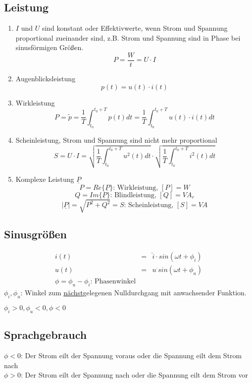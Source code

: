\documentclass[german]{article}
\begin{document}


\subsection{Leistung}
\begin{enumerate}
	\item $I$ und $U$ sind konstant oder Effektivwerte, wenn Strom und Spannung proportional zueinander sind, z.B. Strom und Spannung sind in Phase bei sinusförmigen Größen.
		\[ P = \frac{W}{t} = U \cdot I \]
	\item Augenblicksleistung
		\[ p(t) = u(t) \cdot i(t) \]
	\item Wirkleistung
		\[ P = \tilde{p} = \frac1T \int_{t_0}^{t_0 + T} p(t) dt = \frac1T \int_{t_0}^{t_0 + T} u(t) \cdot i(t) dt \]
	\item Scheinleistung, Strom und Spannung sind nicht mehr proportional
		\[ S = U \cdot I = \sqrt{\frac1T \int_{t_0}^{t_0 + T} u^2 (t) dt} \cdot \sqrt{\frac1T \int_{t_0}^{t_0 + T} i^2 (t) dt} \]
	\item Komplexe Leistung $\underline P$
		\[ P = Re\{\underline P\} \text{: Wirkleistung, } [P] = W \]
		\[ Q = Im\{\underline P\} \text{: Blindleistung, } [Q] = VA_r \]
		\[ |\underline P| = \sqrt{P^2 + Q^2} = S \text{: Scheinleistung, } [S] = VA \]
\end{enumerate}

\subsection{Sinusgrößen}

\begin{eqnarray*}
	i(t) & = & \hat{i} \cdot sin(\omega t + \phi_i) \\
	u(t) & = & u^ \cdot sin(\omega t + \phi_u) \\
	\phi = \phi_u - \phi_i \text{: Phasenwinkel}
\end{eqnarray*}
$\phi_i, \phi_u$: Winkel zum \underline{nächst}gelegenen Nulldurchgang mit anwachsender Funktion.

$\phi_i > 0, \phi_u < 0, \phi < 0$

\subsection{Sprachgebrauch}
$\phi < 0$: Der Strom eilt der Spannung voraus oder die Spannung eilt dem Strom nach \\
$\phi > 0$: Der Strom eilt der Spannung nach oder die Spannung eilt dem Strom vor
\end{document}
